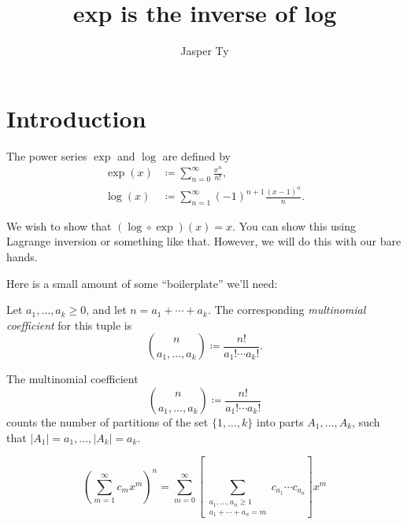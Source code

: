 \documentclass{article}
\title{exp is the inverse of log}
\author{Jasper Ty}
\date{}
\begin{document}
\maketitle

\tableofcontents

\section{Introduction}

\begin{definition}
    The power series $\exp$ and $\log$ are defined by 
    \begin{align}
        \exp(x)
        &\coloneq
        \sum_{n=0}^\infty
        \frac{x^n}{n!},
        \\
        \log(x)
        &\coloneq
        \sum_{n=1}^\infty
        (-1)^{n+1}
        \frac{(x-1)^n}{n}.
    \end{align}
\end{definition}

We wish to show that $(\log \circ \exp)(x) = x$.
You can show this using Lagrange inversion or something like that.
However, we will do this with our bare hands.

Here is a small amount of some ``boilerplate'' we'll need:

\begin{definition}
    Let $a_1,\ldots,a_k \geq 0$, and let $n = a_1 + \cdots + a_k$.
    The corresponding \textit{multinomial coefficient} for this tuple is
    \[
        \binom{n}{a_1,\ldots,a_k}
        \coloneq
        \frac{n!}{a_1! \cdots a_k!}.
    \]
\end{definition}

\begin{proposition}
    The multinomial coefficient 
    \[
        \binom{n}{a_1,\ldots,a_k}
        \coloneq
        \frac{n!}{a_1! \cdots a_k!}
    \]
    counts the number of partitions of the set $\{1, \ldots, k\}$ into parts $A_1, \ldots, A_k$, such that $|A_1| = a_1, \ldots, |A_k| = a_k$.
\end{proposition}

\begin{proposition}
    \begin{equation}
        \label{eq:powerrule}
        \left(
            \sum_{m=1}^\infty
            c_mx^m
        \right)^n
        =
        \sum_{m=0}^\infty
        \left[
            \sum_{
                \substack{
                    a_1,\ldots,a_n \geq 1 \\
                    a_1 + \cdots + a_n = m
                }
            }
            c_{a_1} \cdots c_{a_n}
        \right]
        x^m
    \end{equation}
\end{proposition}
\end{document}
